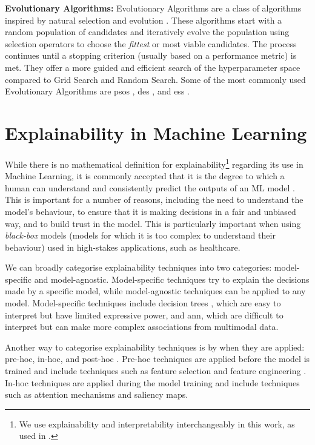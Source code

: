 \textbf{Evolutionary Algorithms:} Evolutionary Algorithms are a class of algorithms inspired by natural selection and evolution \cite{simon_evolutionary_2013}. These algorithms start with a random population of candidates and iteratively evolve the population using selection operators to choose the \emph{fittest} or most viable candidates. The process continues until a stopping criterion (usually based on a performance metric) is met. They offer a more guided and efficient search of the hyperparameter space compared to Grid Search and Random Search. Some of the most commonly used Evolutionary Algorithms are \glspl{pso} \cite{kennedy_particle_1995}, \glspl{de} \cite{storn_differential_1997}, and \glspl{es} \cite{emmerich_evolution_2018}.



\section{Explainability in Machine Learning}
\label{sec:intro_explainability}
While there is no mathematical definition for explainability\footnote{We use explainability and interpretability interchangeably in this work, as used in \cite{kamath_introduction_2021}.} regarding its use in Machine Learning, it is commonly accepted that it is the degree to which a human can understand and consistently predict the outputs of an ML model \cite{kamath_introduction_2021}. This is important for a number of reasons, including the need to understand the model's behaviour, to ensure that it is making decisions in a fair and unbiased way, and to build trust in the model. This is particularly important when using \emph{black-box} models (models for which it is too complex to understand their behaviour) used in high-stakes applications, such as healthcare.

We can broadly categorise explainability techniques into two categories: model-specific and model-agnostic. Model-specific techniques try to explain the decisions made by a specific model, while model-agnostic techniques can be applied to any model. Model-specific techniques include decision trees \cite{breiman_classification_2017}, which are easy to interpret but have limited expressive power, and \gls{ann}, which are difficult to interpret but can make more complex associations from multimodal data. 

Another way to categorise explainability techniques is by when they are applied: pre-hoc, in-hoc, and post-hoc \cite{molnar_interpretable_nodate}. Pre-hoc techniques are applied before the model is trained and include techniques such as feature selection and feature engineering \cite{guyon_introduction_2003}. In-hoc techniques are applied during the model training and include techniques such as attention mechanisms and saliency maps. 

